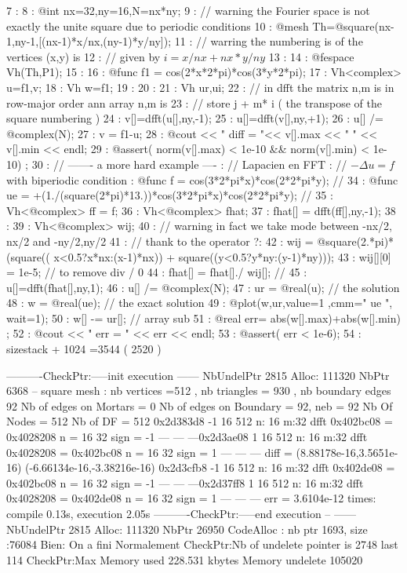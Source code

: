 \documentclass[a4paper,twoside,12pt]{book}
\begin{document}
    7 :
    8 : @int nx=32,ny=16,N=nx*ny;
    9 : // warning the Fourier space is not exactly the unite square due to periodic conditions
   10 : @mesh Th=@square(nx-1,ny-1,[(nx-1)*x/nx,(ny-1)*y/ny]);
   11 : // warring  the numbering is of the vertices (x,y) is
   12 : // given by $  i = x/nx + nx* y/ny $
   13 :
   14 : @fespace Vh(Th,P1);
   15 :
   16 : @func f1 = cos(2*x*2*pi)*cos(3*y*2*pi);
   17 : Vh<complex> u=f1,v;
   18 : Vh w=f1;
   19 :
   20 :
   21 : Vh  ur,ui;
   22 : //  in dfft the matrix n,m is in row-major order ann array n,m is
   23 : // store j + m* i ( the transpose of the square numbering )
   24 :  v[]=dfft(u[],ny,-1);
   25 :  u[]=dfft(v[],ny,+1);
   26 :  u[] /= @complex(N);
   27 :  v = f1-u;
   28 : @cout << " diff = "<< v[].max << " " <<  v[].min << endl;
   29 : @assert( norm(v[].max) < 1e-10 &&  norm(v[].min) < 1e-10) ;
   30 :  // -------  a more hard example ---- :  // Lapacien en FFT  :  // $ -\Delta u = f $ with biperiodic condition  : @func f = cos(3*2*pi*x)*cos(2*2*pi*y); //
   34 : @func ue =  +(1./(square(2*pi)*13.))*cos(3*2*pi*x)*cos(2*2*pi*y);  //
   35 : Vh<@complex> ff = f;
   36 : Vh<@complex> fhat;
   37 : fhat[] = dfft(ff[],ny,-1);
   38 :
   39 : Vh<@complex> wij;
   40 : // warning in fact we take mode between -nx/2, nx/2 and -ny/2,ny/2
   41 : //  thank to the operator ?: \label{?:}
   42 : wij = @square(2.*pi)*(square(( x<0.5?x*nx:(x-1)*nx))
            + square((y<0.5?y*ny:(y-1)*ny)));
   43 : wij[][0] = 1e-5; // to remove div / 0
   44 : fhat[] = fhat[]./ wij[];  //
   45 : u[]=dfft(fhat[],ny,1);
   46 : u[] /= @complex(N);
   47 : ur = @real(u); // the solution
   48 : w = @real(ue); // the exact solution
   49 : @plot(w,ur,value=1 ,cmm=" ue   ", wait=1);
   50 : w[] -= ur[]; // array sub
   51 : @real err= abs(w[].max)+abs(w[].min) ;
   52 : @cout << " err = " << err << endl;
   53 : @assert( err  < 1e-6);
   54 :  sizestack + 1024 =3544  ( 2520 )
   
----------CheckPtr:-----init execution ------ NbUndelPtr  2815  Alloc: 111320  NbPtr 6368
 -- square mesh : nb vertices  =512 ,  nb triangles = 930 ,  nb boundary edges 92
   Nb of edges on Mortars  = 0
   Nb of edges on Boundary = 92, neb = 92
 Nb Of Nodes = 512
 Nb of DF = 512
0x2d383d8 -1 16 512 n: 16 m:32
 dfft 0x402bc08 = 0x4028208 n = 16 32 sign = -1
 --- --- ---0x2d3ae08 1 16 512 n: 16 m:32
 dfft 0x4028208 = 0x402bc08 n = 16 32 sign = 1
 --- --- --- diff = (8.88178e-16,3.5651e-16) (-6.66134e-16,-3.38216e-16)
0x2d3cfb8 -1 16 512 n: 16 m:32
 dfft 0x402de08 = 0x402bc08 n = 16 32 sign = -1
 --- --- ---0x2d37ff8 1 16 512 n: 16 m:32
 dfft 0x4028208 = 0x402de08 n = 16 32 sign = 1
 --- --- --- err = 3.6104e-12
times: compile 0.13s, execution 2.05s
----------CheckPtr:-----end execution -- ------ NbUndelPtr  2815  Alloc: 111320  NbPtr 26950
 CodeAlloc : nb ptr  1693,  size :76084
Bien: On a fini Normalement
                CheckPtr:Nb of undelete pointer is 2748 last 114
                CheckPtr:Max Memory used    228.531 kbytes  Memory undelete 105020
\eFF
\end{document}
